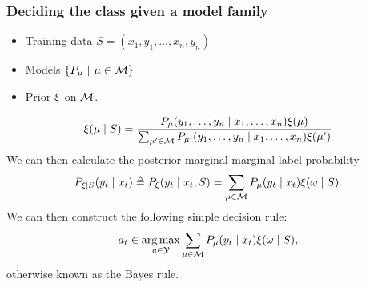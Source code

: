 \begin{frame}
  \frametitle{Deciding the class given a model family}
  \begin{itemize}
  \item Training data $S = (x_1, y_1, \ldots, x_n, y_n)$
  \item Models $\left\{P_\mu ~\middle|~ \mu \in {\mathcal{M}}\right\}$
  \item Prior $\xi$ on ${\mathcal{M}}$.
  \end{itemize}
  \[
    \xi(\mu \mid S)
    = \frac{P_\mu(y_1, \ldots, y_n \mid x_1, \ldots, x_n) \xi(\mu)}
    {\sum_{\mu' \in {\mathcal{M}}} P_{\mu'}(y_1, \ldots, y_n \mid x_1, \ldots, x_n) \xi(\mu')}
  \]
  We can then calculate the posterior marginal marginal label probability
  \[
    P_{\xi \mid S}(y_t \mid x_t) \mathrel{\triangleq}
    P_{\xi}(y_t \mid x_t, S) = 
    \sum_{\mu \in {\mathcal{M}}} P_\mu(y_t \mid x_t) \xi(\omega \mid S).
  \]
  We can then construct the following simple decision rule:
  \[
    a_t \in \mathop{\rm arg\,max}_{a \in {\mathcal{Y}}}\sum_{\mu \in {\mathcal{M}}} P_\mu(y_t \mid x_t) \xi(\omega \mid S),
  \]
  otherwise known as the \alert{Bayes rule}.
\end{frame}


